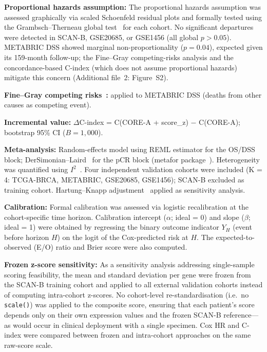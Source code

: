 \documentclass[pdflatex,sn-vancouver-num]{sn-jnl}
\begin{document}
\textbf{Proportional hazards assumption:} The proportional hazards assumption was assessed graphically via scaled Schoenfeld residual plots and formally tested using the Grambsch--Therneau global test~\cite{grambsch1994} for each cohort. No significant departures were detected in SCAN-B, GSE20685, or GSE1456 (all global $p > 0.05$). METABRIC DSS showed marginal non-proportionality ($p = 0.04$), expected given its 159-month follow-up; the Fine--Gray competing-risks analysis and the concordance-based C-index (which does not assume proportional hazards) mitigate this concern (Additional file~2: Figure~S2).

\textbf{Fine--Gray competing risks~\cite{fine1999}:} applied to METABRIC DSS (deaths from other causes as competing event).

\textbf{Incremental value:} $\Delta$C-index = C(CORE-A + score\_z) $-$ C(CORE-A); bootstrap 95\% CI ($B = 1{,}000$).

\textbf{Meta-analysis:} Random-effects model using REML estimator for the OS/DSS block; DerSimonian--Laird~\cite{dersimonian1986} for the pCR block (metafor package~\cite{viechtbauer2010}). Heterogeneity was quantified using $I^2$~\cite{higgins2003}. Four independent validation cohorts were included (K = 4: TCGA-BRCA, METABRIC, GSE20685, GSE1456); SCAN-B excluded as training cohort. Hartung--Knapp adjustment~\cite{hartung2001} applied as sensitivity analysis.

\textbf{Calibration:} Formal calibration was assessed via logistic recalibration at the cohort-specific time horizon. Calibration intercept ($\alpha$; ideal = 0) and slope ($\beta$; ideal = 1) were obtained by regressing the binary outcome indicator $Y_H$ (event before horizon $H$) on the logit of the Cox-predicted risk at $H$. The expected-to-observed (E/O) ratio and Brier score were also computed.

\textbf{Frozen z-score sensitivity:} As a sensitivity analysis addressing single-sample scoring feasibility, the mean and standard deviation per gene were frozen from the SCAN-B training cohort and applied to all external validation cohorts instead of computing intra-cohort z-scores. No cohort-level re-standardisation (i.e.\ no \texttt{scale()}) was applied to the composite score, ensuring that each patient's score depends only on their own expression values and the frozen SCAN-B reference---as would occur in clinical deployment with a single specimen. Cox HR and C-index were compared between frozen and intra-cohort approaches on the same raw-score scale.
\end{document}
